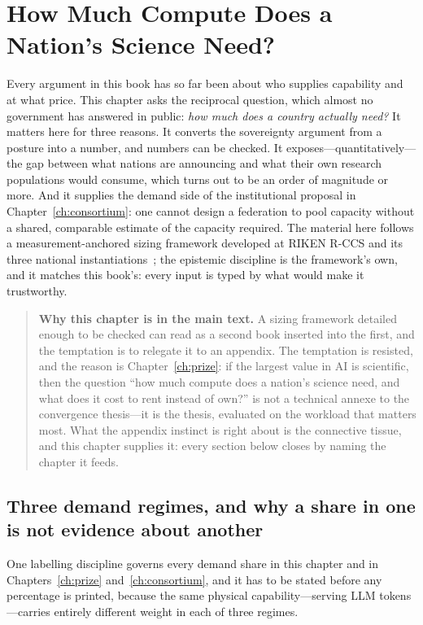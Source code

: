 \chapter{How Much Compute Does a Nation's Science Need?}
\label{ch:sizing}

Every argument in this book has so far been about who supplies capability and at what price. This chapter asks the reciprocal question, which almost no government has answered in public: \emph{how much does a country actually need?} It matters here for three reasons. It converts the sovereignty argument from a posture into a number, and numbers can be checked. It exposes---quantitatively---the gap between what nations are announcing and what their own research populations would consume, which turns out to be an order of magnitude or more. And it supplies the demand side of the institutional proposal in Chapter~\ref{ch:consortium}: one cannot design a federation to pool capacity without a shared, comparable estimate of the capacity required. The material here follows a measurement-anchored sizing framework developed at RIKEN R-CCS and its three national instantiations~\cite{ai4s-framework}; the epistemic discipline is the framework's own, and it matches this book's: every input is typed by what would make it trustworthy.

\begin{quote}\small
\textbf{Why this chapter is in the main text.} A sizing framework detailed enough to be checked can read as a second book inserted into the first, and the temptation is to relegate it to an appendix. The temptation is resisted, and the reason is Chapter~\ref{ch:prize}: if the largest value in AI is scientific, then the question ``how much compute does a nation's science need, and what does it cost to rent instead of own?'' is not a technical annexe to the convergence thesis---it is the thesis, evaluated on the workload that matters most. What the appendix instinct is right about is the connective tissue, and this chapter supplies it: every section below closes by naming the chapter it feeds.
\end{quote}

\section{Three demand regimes, and why a share in one is not evidence about another}
\label{sec:regimes}

One labelling discipline governs every demand share in this chapter and in Chapters~\ref{ch:prize} and~\ref{ch:consortium}, and it has to be stated before any percentage is printed, because the same physical capability---serving LLM tokens---carries entirely different weight in each of three regimes.

